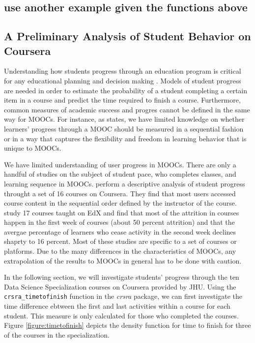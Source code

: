 \subsection{use another example given the functions
above}\label{use-another-example-given-the-functions-above}

\subsection{A Preliminary Analysis of Student Behavior on
Coursera}\label{a-preliminary-analysis-of-student-behavior-on-coursera}

Understanding how students progress through an education program is
critical for any educational planning and decision making
\citep{king1972primary}. Models of student progress are needed in order
to estimate the probability of a student completing a certain item in a
course and predict the time required to finish a course. Furthermore,
common measures of academic success and progres cannot be defined in the
same way for MOOCs. For instance, as \cite{perna2014moving} states, we
have limited knowledge on whether learners' progress through a MOOC
should be measured in a sequential fashion or in a way that captures the
flexibility and freedom in learning behavior that is unique to MOOCs.

We have limited understanding of user progress in MOOCs. There are only
a handful of studies on the subject of student pace, who completes
classes, and learning sequence in MOOCs. \cite{perna2014moving} perform
a descriptive analysis of student progress throught a set of 16 courses
on Coursera. They find that most users accessed course content in the
sequential order defined by the instructor of the course.
\cite{ho2014harvardx} study 17 courses taught on EdX and find that most
of the attrition in courses happen in the first week of courses (about
50 percent attrition) and that the avergae percentage of learners who
cease activity in the second week declines shaprty to 16 percent. Most
of these studies are specific to a set of courses or platforms. Due to
the many differences in the characteristics of MOOCs, any extrapolation
of the results to MOOCs in general has to be done with caution.

In the following section, we will investigate students' progress through
the ten Data Science Specialization courses on Coursera provided by JHU.
Using the \texttt{crsra\_timetofinish} function in the \emph{crsra}
package, we can first investigate the time difference ebtween the first
and last activities within a course for each student. This measure is
only calculated for those who completed the courses. Figure
\ref{figure:timetofinish} depicts the density function for time to
finish for three of the courses in the specialization.

